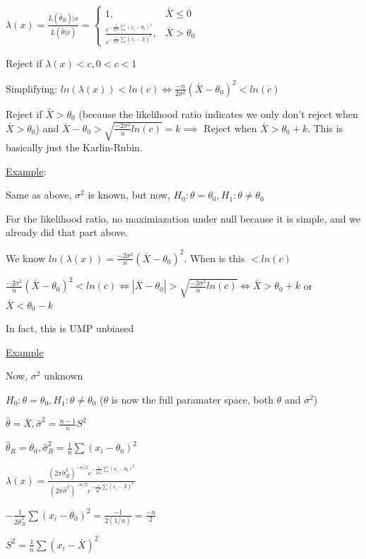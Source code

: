 \documentclass{article}
\let\Oldsum=\sum
\renewcommand{\sum}{\Oldsum\limits}
\begin{document}
$\lambda(x) = \frac{L(\hat{\theta}_R)|x}{L(\hat{\theta}|x)} = \begin{cases} 1, & \bar{X} \le 0 \\ \frac{e^{-\frac{1}{2\sigma^2}\sum (x_i - \theta_0)^2}}{e^{-\frac{1}{2\sigma^2}\sum (x_i - \bar{X})^2}}, & \bar{X} > \theta_0 \end{cases}$

Reject if $\lambda(x) < c, 0 < c < 1$

Simplifying: $ln(\lambda(x)) < ln(c) \iff \frac{-n}{2\sigma^2}(\bar{X} - \theta_0)^2 < ln(c)$

Reject if $\bar{X} > \theta_0$ (because the likelihood ratio indicates we only don't reject when $\bar{X} > \theta_0$) and $\bar{X} - \theta_0 > \sqrt{\frac{-2\sigma^2}{n}ln(c)} = k \implies$ Reject when $\bar{X} > \theta_0 + k$. This is basically just the Karlin-Rubin.

\underline{Example}:

Same as above, $\sigma^2$ is known, but now, $H_0: \theta = \theta_0, H_1: \theta \neq \theta_0$

For the likelihood ratio, no maximiazation under null because it is simple, and we already did that part above. 

We know $ln(\lambda(x)) = \frac{-2\sigma^2}{n}(\bar{X} - \theta_0)^2$. When is this $< ln(c)$

$\frac{-2\sigma^2}{n}(\bar{X} - \theta_0)^2 < ln(c) \iff |\bar{X} - \theta_0| > \sqrt{\frac{-2\sigma^2}{n}ln(c)} \iff \bar{X} > \theta_0 + k$ or $\bar{X} < \theta_0 - k$

In fact, this is UMP unbiased

\underline{Example}

Now, $\sigma^2$ unknown

$H_0:\theta = \theta_0, H_1: \theta \neq \theta_0$ ($\theta$ is now the full paramater space, both $\theta$ and $\sigma^2$)

$\hat{\theta} = \bar{X}, \hat{\sigma}^2 = \frac{n-1}{n}S^2$

$\hat{\theta}_R = \theta_0, \hat{\sigma}^2_R = \frac{1}{n}\sum (x_i - \theta_0)^2$

$\lambda(x) = \frac{(2\pi \hat{\sigma}^2_R)^{-n/2}e^{-\frac{1}{2\hat{\sigma}^2_R}\sum(x_i - \theta_0)^2}}{(2\pi \hat{\sigma}^2)^{-n/2}e^{-\frac{1}{2\hat{\sigma}^2}\sum(x_i - \bar{X})^2}}$ 

$-\frac{1}{2\hat{\sigma}^2_R}\sum (x_i - \theta_0)^2 = \frac{-1}{2(1/n)} = \frac{-n}{2}$

$S^2 = \frac{1}{n}\sum(x_i - \bar{X})^2$
\end{document}
